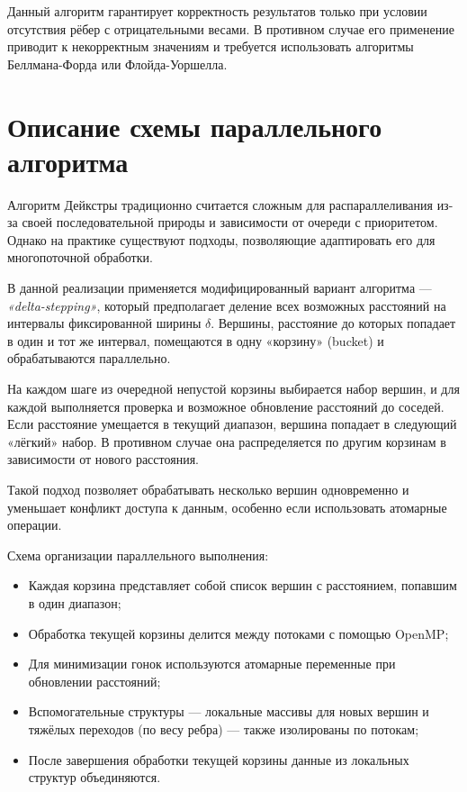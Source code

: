 \documentclass[12pt,a4paper]{extarticle}
\begin{document}
Данный алгоритм гарантирует корректность результатов только при условии отсутствия рёбер с
отрицательными весами. В противном случае его применение приводит к некорректным значениям
и требуется использовать алгоритмы Беллмана-Форда или Флойда-Уоршелла.

\section{Описание схемы параллельного алгоритма}

Алгоритм Дейкстры традиционно считается сложным для распараллеливания из-за своей
последовательной природы и зависимости от очереди с приоритетом. Однако на практике
существуют подходы, позволяющие адаптировать его для многопоточной обработки.

В данной реализации применяется модифицированный вариант алгоритма — \textit{«delta-stepping»},
который предполагает деление всех возможных расстояний на интервалы фиксированной ширины
$\delta$. Вершины, расстояние до которых попадает в один и тот же интервал, помещаются
в одну «корзину» (bucket) и обрабатываются параллельно.

На каждом шаге из очередной непустой корзины выбирается набор вершин, и для каждой
выполняется проверка и возможное обновление расстояний до соседей. Если расстояние
умещается в текущий диапазон, вершина попадает в следующий «лёгкий» набор. В противном
случае она распределяется по другим корзинам в зависимости от нового расстояния.

Такой подход позволяет обрабатывать несколько вершин одновременно и уменьшает
конфликт доступа к данным, особенно если использовать атомарные операции.

Схема организации параллельного выполнения:

\begin{itemize}
    \item Каждая корзина представляет собой список вершин с расстоянием, попавшим в один диапазон;
    \item Обработка текущей корзины делится между потоками с помощью OpenMP;
    \item Для минимизации гонок используются атомарные переменные при обновлении расстояний;
    \item Вспомогательные структуры — локальные массивы для новых вершин и тяжёлых переходов
    (по весу ребра) — также изолированы по потокам;
    \item После завершения обработки текущей корзины данные из локальных структур объединяются.
\end{itemize}
\end{document}

